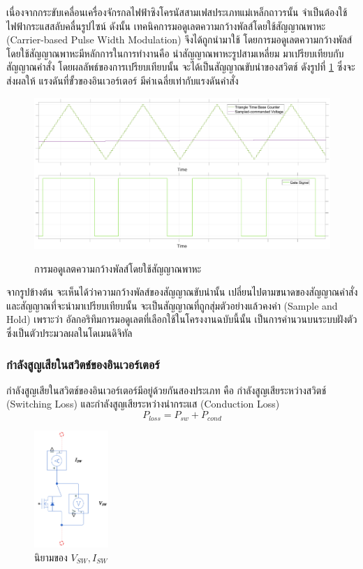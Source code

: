\documentclass[11pt,a4paper]{article}
\begin{document}
เนื่องจากกระขับเคลื่อนเครื่องจักรกลไฟฟ้าซิงโครนัสสามเฟสประเภทแม่เหล็กถาวรนั้น จำเป็นต้องใช้ไฟฟ้ากระแสสลับคลื่นรูปไซน์ ดังนั้น เทคนิคการมอดูเลตความกว้างพัลส์โดยใช้สัญญาณพาหะ (Carrier-based Pulse Width Modulation) จึงได้ถูกนำมาใช้ โดยการมอดูเลตความกว้างพัลส์โดยใช้สัญญาณพาหะมีหลักการในการทำงานคือ นำสัญญาณพาหะรูปสามเหลี่ยม มาเปรียบเทียบกับสัญญาณคำสั่ง โดยผลลัพธ์ของการเปรียบเทียบนั้น จะได้เป็นสัญญาณขับนำของสวิตช์ ดังรูปที่ \ref{spwmgraph} ซึ่งจะส่งผลให้ แรงดันที่ขั้วของอินเวอร์เตอร์ มีค่าเฉลี่ยเท่ากับแรงดันคำสั่ง

\begin{figure}[!h]
    \includegraphics[width=\textwidth]{spwm.eps}
    \label{spwmgraph}
    \caption{การมอดูเลตความกว้างพัลส์โดยใช้สัญญาณพาหะ}
\end{figure}

จากรูปข้างต้น จะเห็นได้ว่าความกว้างพัลส์ของสัญญาณขับนำนั้น เปลี่ยนไปตามขนาดของสัญญาณคำสั่ง และสัญญาณที่จะนำมาเปรียบเทียบนั้น จะเป็นสัญญาณที่ถูกสุ่มตัวอย่างแล้วคงค่า (Sample and Hold) เพราะว่า อัลกอริทึมการมอดูเลตที่เลือกใช้ในโครงงานฉบับนี้นั้น เป็นการคำนวนบนระบบฝังตัว ซึ่งเป็นตัวประมวลผลในโดเมนดิจิทัล

\subsubsection{กำลังสูญเสียในสวิตช์ของอินเวอร์เตอร์}
กำลังสูญเสียในสวิตช์ของอินเวอร์เตอร์มีอยู่ด้วยกันสองประเภท คือ กำลังสูญเสียระหว่างสวิตช์ (Switching Loss) และกำลังสูญเสียระหว่างนำกระแส (Conduction Loss)
\begin{equation}
    P_{loss} = P_{sw} + P_{cond}
\end{equation}

\begin{figure}[h]
    \begin{center}
        \includegraphics[width=0.25\textwidth]{vsw_isw.png}
    \end{center}
    \caption{นิยามของ $V_{SW}, I_{SW}$}
    \label{vsw_isw_definition}
\end{figure}
\end{document}

